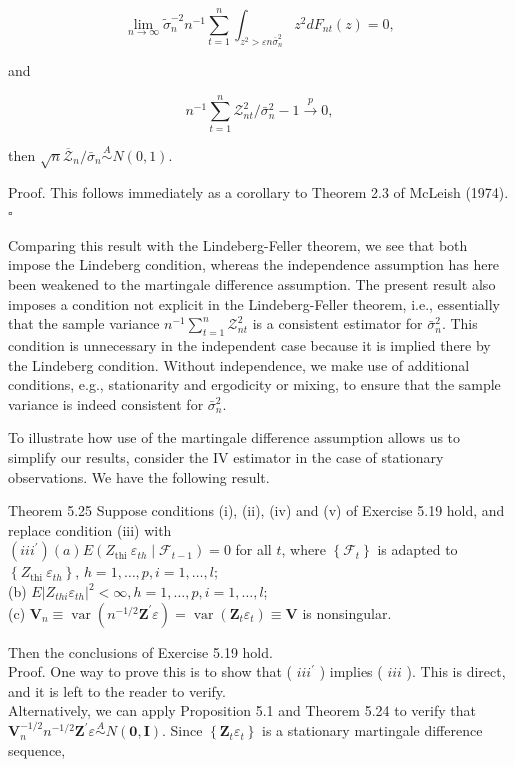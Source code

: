 \documentclass[10pt]{article}
\begin{document}
$$
\lim _{n \rightarrow \infty} \tilde{\sigma}_{n}^{-2} n^{-1} \sum_{t=1}^{n} \int_{z^{2}>\varepsilon n \bar{\sigma}_{n}^{2}} z^{2} d F_{n t}(z)=0,
$$

and

$$
n^{-1} \sum_{t=1}^{n} \mathcal{Z}_{n t}^{2} / \bar{\sigma}_{n}^{2}-1 \xrightarrow{p} 0,
$$

then $\sqrt{n} \overline{\mathcal{Z}}_{n} / \bar{\sigma}_{n} \stackrel{A}{\sim} N(0,1)$.

Proof. This follows immediately as a corollary to Theorem 2.3 of McLeish (1974). \(\square\)

Comparing this result with the Lindeberg-Feller theorem, we see that both impose the Lindeberg condition, whereas the independence assumption has here been weakened to the martingale difference assumption. The present result also imposes a condition not explicit in the Lindeberg-Feller theorem, i.e., essentially that the sample variance $n^{-1} \sum_{t=1}^{n} \mathcal{Z}_{n t}^{2}$ is a consistent estimator for $\bar{\sigma}_{n}^{2}$. This condition is unnecessary in the independent case because it is implied there by the Lindeberg condition. Without independence, we make use of additional conditions, e.g., stationarity and ergodicity or mixing, to ensure that the sample variance is indeed consistent for $\bar{\sigma}_{n}^{2}$.

To illustrate how use of the martingale difference assumption allows us to simplify our results, consider the IV estimator in the case of stationary observations. We have the following result.

Theorem 5.25 Suppose conditions (i), (ii), (iv) and (v) of Exercise 5.19 hold, and replace condition (iii) with\\
$\left(i i i^{\prime}\right)(a) E\left(Z_{\text {thi }} \varepsilon_{t h} \mid \mathcal{F}_{t-1}\right)=0$ for all $t$, where $\left\{\mathcal{F}_{t}\right\}$ is adapted to $\left\{Z_{\text {thi }} \varepsilon_{t h}\right\}$, $h=1, \ldots, p, i=1, \ldots, l$;\\
(b) $E\left|Z_{t h i} \varepsilon_{t h}\right|^{2}<\infty, h=1, \ldots, p, i=1, \ldots, l$;\\
(c) $\mathbf{V}_{n} \equiv \operatorname{var}\left(n^{-1 / 2} \mathbf{Z}^{\prime} \varepsilon\right)=\operatorname{var}\left(\mathbf{Z}_{t} \varepsilon_{t}\right) \equiv \mathbf{V}$ is nonsingular.

Then the conclusions of Exercise 5.19 hold.\\
Proof. One way to prove this is to show that ( $i i i^{\prime}$ ) implies ( $i i i$ ). This is direct, and it is left to the reader to verify.\\
Alternatively, we can apply Proposition 5.1 and Theorem 5.24 to verify that $\mathbf{V}_{n}^{-1 / 2} n^{-1 / 2} \mathbf{Z}^{\prime} \varepsilon \stackrel{A}{\sim} N(\mathbf{0}, \mathbf{I})$. Since $\left\{\mathbf{Z}_{t} \varepsilon_{t}\right\}$ is a stationary martingale difference sequence,
\end{document}
